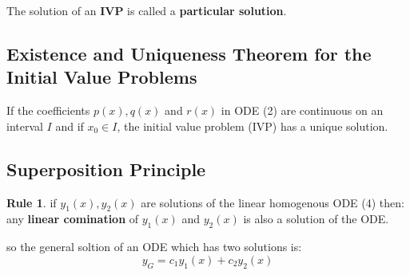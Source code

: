 \documentclass[11pt]{article}
\theoremstyle{definition}
\newtheorem{reg}{Rule}
\begin{document}
The solution of an \textbf{IVP} is called a \textbf{particular solution}.
\subsection{Existence and Uniqueness Theorem for the Initial Value Problems}

If the coefficients $p(x), q(x)$ and $r(x)$ in ODE (2) are continuous
on an interval $I$ and if $x_0\in I$, the initial value problem (IVP) has a unique solution.

\subsection{Superposition Principle}
\begin{reg}if $y_1(x), y_2(x)$ are solutions of the linear homogenous ODE (4) then: any \textbf{linear comination} of  $y_1(x)$ and $y_2(x)$ is also a solution of the ODE.
\end{reg}
so the general soltion of an ODE which has two solutions is:
\begin{equation}
    y_G = c_1 y_1(x)+c_2 y_2(x) 
\end{equation}
\end{document}

